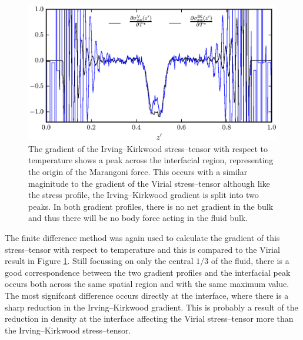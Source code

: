 \begin{figure}[h]
\centering
\includegraphics[scale=0.8]{PisIKForce}
\caption{The gradient of the Irving--Kirkwood stress--tensor with respect to temperature shows a peak across the interfacial region, representing the origin of the Marangoni force. This occurs with a similar maginitude to the gradient of the Virial stress--tensor although like the stress profile, the Irving--Kirkwood gradient is split into two peaks.
In both gradient profiles, there is no net gradient in the bulk and thus there will be no body force acting in the fluid bulk.}
\label{PisIKForce}
\end{figure}
The finite difference method was again used to calculate the gradient of this stress--tensor with respect to temperature and this is compared to the Virial result in Figure \ref{PisIKForce}.
Still focussing on only the central $1/3$ of the fluid, there is a good correspondence between the two gradient profiles and the interfacial peak occurs both across the same spatial region and with the same maximum value.
The most signifcant difference occurs directly at the interface, where there is a sharp reduction in the Irving--Kirkwood gradient.
This is probably a result of the reduction in density at the interface affecting the Virial stress--tensor more than the Irving--Kirkwood stress--tensor.
\FloatBarrier

